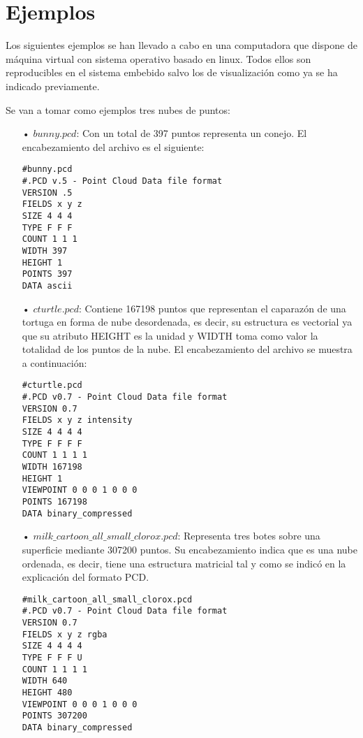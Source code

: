 \section{Ejemplos}
Los siguientes ejemplos se han llevado a cabo en una computadora que dispone de máquina virtual con sistema operativo basado en linux. Todos ellos son reproducibles en el sistema embebido salvo los de visualización como ya se ha indicado previamente.

Se van a tomar como ejemplos tres nubes de puntos:
\begin{itemize}
\item[•]$bunny.pcd$: 
Con un total de 397 puntos representa un conejo. El encabezamiento del archivo es el siguiente:\\
\begin{lstlisting}
#bunny.pcd
#.PCD v.5 - Point Cloud Data file format
VERSION .5
FIELDS x y z
SIZE 4 4 4
TYPE F F F
COUNT 1 1 1
WIDTH 397
HEIGHT 1
POINTS 397
DATA ascii
\end{lstlisting}

\item[•]$cturtle.pcd$:
Contiene 167198 puntos que representan el caparazón de una tortuga en forma de nube desordenada, es decir, su estructura es vectorial ya que su atributo HEIGHT es la unidad y WIDTH toma como valor la totalidad de los puntos de la nube. El encabezamiento del archivo se muestra a continuación:\\
\begin{lstlisting}
#cturtle.pcd
#.PCD v0.7 - Point Cloud Data file format
VERSION 0.7
FIELDS x y z intensity
SIZE 4 4 4 4
TYPE F F F F
COUNT 1 1 1 1
WIDTH 167198
HEIGHT 1
VIEWPOINT 0 0 0 1 0 0 0
POINTS 167198
DATA binary_compressed
\end{lstlisting}


\item[•]$milk\_cartoon\_all\_small\_clorox.pcd$:
Representa tres botes sobre una superficie mediante 307200 puntos. Su encabezamiento indica que es una nube ordenada, es decir, tiene una estructura matricial tal y como se indicó en la explicación del formato PCD.\\
\begin{lstlisting}
#milk_cartoon_all_small_clorox.pcd
#.PCD v0.7 - Point Cloud Data file format
VERSION 0.7
FIELDS x y z rgba
SIZE 4 4 4 4
TYPE F F F U
COUNT 1 1 1 1
WIDTH 640
HEIGHT 480
VIEWPOINT 0 0 0 1 0 0 0
POINTS 307200
DATA binary_compressed
\end{lstlisting}

\end{itemize}

